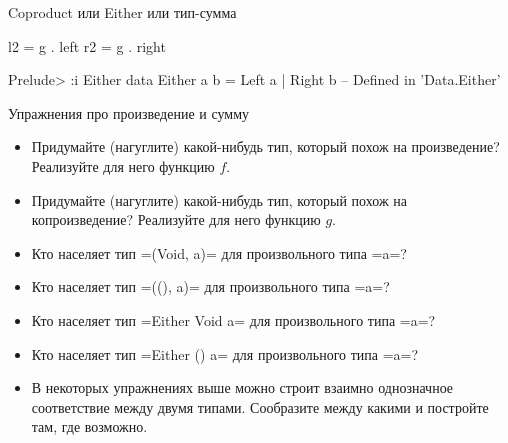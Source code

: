 \documentclass{beamer}
\begin{document}

\begin{frame}[fragile]{Coproduct или Either или тип-сумма}
\begin{center}
\end{center}
\begin{hslisting}
l2 = g . left
r2 = g . right

Prelude> :i Either
data Either a b = Left a | Right b      
-- Defined in 'Data.Either'
\end{hslisting}
\end{frame}

\begin{frame}[fragile]{Упражнения про произведение и сумму}
\begin{itemize}
 \item Придумайте (нагуглите) какой-нибудь тип, который похож на произведение? Реализуйте для него функцию $f$.
 \item Придумайте (нагуглите) какой-нибудь тип, который похож на копроизведение? Реализуйте для него функцию $g$.
 \item Кто населяет тип \hsinline=(Void, a)= для произвольного типа \hsinline=a=?
 \item Кто населяет тип \hsinline=((), a)= для произвольного типа \hsinline=a=?
 \item Кто населяет тип \hsinline=Either Void a= для произвольного типа \hsinline=a=?
 \item Кто населяет тип \myinline=Either ()   a= для произвольного типа \hsinline=a=?
 \item В некоторых упражнениях выше можно строит взаимно однозначное соответствие между двумя типами. Сообразите между какими и постройте там, где возможно.
\end{itemize}

\end{frame}
\end{document}
